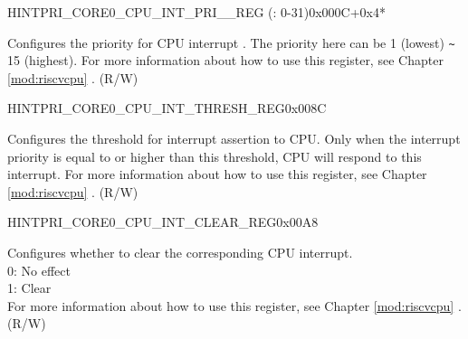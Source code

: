 \begin{register}{H}{INTPRI\_CORE0\_CPU\_INT\_PRI\_\_REG (: 0-31)}{0x000C+0x4*}\label{regdesc:INTPRICORE0CPUINTPRINREG}
%
%
\regnewline%
\begin{regdesc}\begin{reglist}
\label{fielddesc:INTERRUPTCORENCPUPRI0MAP}\item [INTPRI\_CORE0\_CPU\_PRI\_\regindex{n}\_MAP] Configures the priority for CPU interrupt . The priority here can be 1 (lowest) \verb+~+ 15 (highest). For more information about how to use this register, see Chapter \ref{mod:riscvcpu} \textit{}. (R/W)
\end{reglist}\end{regdesc}
\end{register}


\begin{register}{H}{INTPRI\_CORE0\_CPU\_INT\_THRESH\_REG}{0x008C}\label{regdesc:INTPRICORE0CPUINTTHRESHREG}
%
%
\regnewline%
\begin{regdesc}\begin{reglist}
\label{fielddesc:INTPRICORE0CPUINTTHRESH}\item [INTPRI\_CORE0\_CPU\_INT\_THRESH] Configures the threshold for interrupt assertion to CPU. Only when the interrupt priority is equal to or higher than this threshold, CPU will respond to this interrupt. For more information about how to use this register, see Chapter \ref{mod:riscvcpu} \textit{}. (R/W)
\end{reglist}\end{regdesc}
\end{register}




\begin{register}{H}{INTPRI\_CORE0\_CPU\_INT\_CLEAR\_REG}{0x00A8}\label{regdesc:INTPRICORE0CPUINTCLEARREG}
%
\regnewline%
\begin{regdesc}\begin{reglist}
\label{fielddesc:INTPRICORE0CPUINTCLEAR}\item [INTPRI\_CORE0\_CPU\_INT\_CLEAR] Configures whether to clear the corresponding CPU interrupt. \\
0: No effect\\
1: Clear\\
For more information about how to use this register, see Chapter \ref{mod:riscvcpu} \textit{}.\\
(R/W)
\end{reglist}\end{regdesc}
\end{register}



